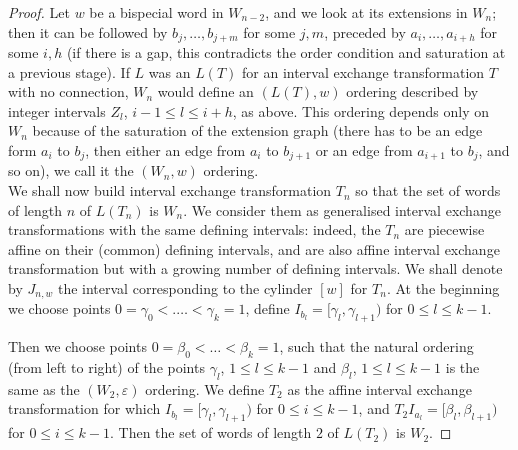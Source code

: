 \documentclass[10pt,a4paper]{amsart}
\begin{document}
\begin{proof}
 
 Let $w$ be a bispecial word in $W_{n-2}$, and we look at its extensions  in $W_n$; then  it can be followed by $b_j,\ldots ,b_{j+m}$ for some $j,m$, preceded by $a_i, \ldots ,a_{i+h}$ for some $i,h$ (if there is a gap, this contradicts the order condition and saturation at a  previous stage). If $L$ was an $L(T)$ for an interval exchange transformation $T$ with no connection, $W_n$ would define an $(L(T),w)$ ordering described by  integer intervals $Z_l$, $i-1\leq l\leq i+h$, as above.
 This ordering depends only on $W_n$ because of the saturation of the extension graph (there has to be an edge form $a_i$ to $b_j$, then either an edge from $a_i$ to $b_{j+1}$ or an edge from $a_{i+1}$ to
$b_j$, 
and so  on), we call it the $(W_n,w)$ ordering.  \\


 We shall now build interval exchange transformation $T_n$ so that the set of words of  length $n$ of  $L(T_n)$ is $W_n$. We consider them  as generalised interval exchange transformations with the same defining intervals: indeed, the $T_n$  are piecewise affine on their (common) defining intervals, and are also affine interval exchange transformation but with a growing number  of defining intervals.  We shall denote by $J_{n,w}$ the interval corresponding to the cylinder $[w]$ for $T_n$. At the beginning we choose
points $0=\gamma_{0}<.\ldots < \gamma_{k}=1$, define  $I_{b_l}=[\gamma_l,\gamma_{l+1})$ for $0\leq  l \leq k-1$.

Then we  choose  points $0=\beta_0<\ldots < \beta_{k}=1$, such that the natural ordering (from left to right) of the points  $\gamma_l$, $1\leq l\leq k-1$
and $\beta_l$, $1\leq l\leq k-1$ is the  same as the $(W_2, \varepsilon)$ ordering. We  define $T_2$ as the affine  interval exchange transformation for which  $I_{b_l}=[\gamma_l,\gamma_{l+1})$ for $0\leq i\leq k-1$, and $T_2I_{a_l}=[\beta_l,\beta_{l+1})$ for $0\leq i\leq k-1$. Then the set of words of length $2$ of $L(T_2)$ is $W_2$. 


\end{proof}
\end{document}
